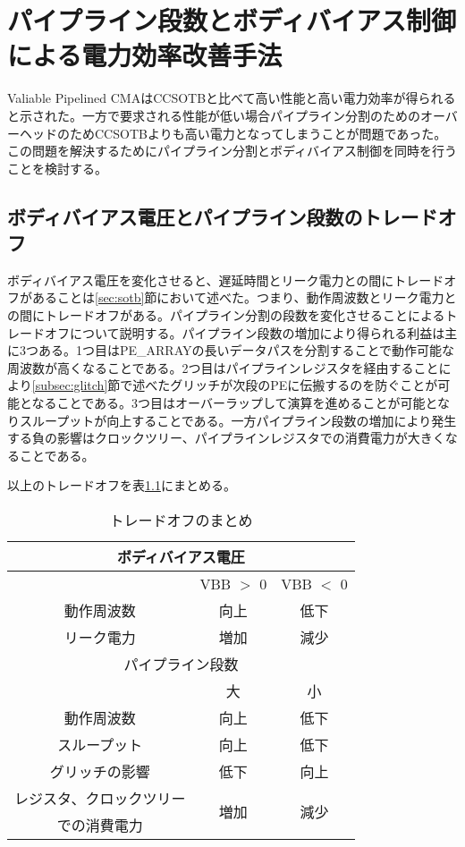 \chapter{パイプライン段数とボディバイアス制御による電力効率改善手法}
{
\label{chap:proposal}
Valiable Pipelined CMAはCCSOTBと比べて高い性能と高い電力効率が得られると示された。\cite{vpcma}一方で要求される性能が低い場合パイプライン分割のためのオーバーヘッドのためCCSOTBよりも高い電力となってしまうことが問題であった。この問題を解決するためにパイプライン分割とボディバイアス制御を同時を行うことを検討する。
\section{ボディバイアス電圧とパイプライン段数のトレードオフ}
\label{sec:trade_off}

ボディバイアス電圧を変化させると、遅延時間とリーク電力との間にトレードオフがあることは\ref{sec:sotb}節において述べた。つまり、動作周波数とリーク電力との間にトレードオフがある。パイプライン分割の段数を変化させることによるトレードオフについて説明する。パイプライン段数の増加により得られる利益は主に3つある。1つ目はPE\_ARRAYの長いデータパスを分割することで動作可能な周波数が高くなることである。2つ目はパイプラインレジスタを経由することにより\ref{subsec:glitch}節で述べたグリッチが次段のPEに伝搬するのを防ぐことが可能となることである。3つ目はオーバーラップして演算を進めることが可能となりスループットが向上することである。一方パイプライン段数の増加により発生する負の影響はクロックツリー、パイプラインレジスタでの消費電力が大きくなることである。

以上のトレードオフを表\ref{table:trade_off}にまとめる。

\begin{table}[h]
\centering
\caption{トレードオフのまとめ}
\label{table:trade_off}
\begin{tabular}{|c|c|c|} \hline
\multicolumn{3}{|c|}{ボディバイアス電圧} \\ \hline
 & VBB $>$ 0 & VBB $<$ 0 \\ \hline \hline
動作周波数 & 向上 & 低下 \\ \hline
リーク電力 & 増加 & 減少 \\ \hline \hline
\multicolumn{3}{|c|}{パイプライン段数} \\ \hline
& 大 & 小 \\ \hline \hline
動作周波数 & 向上 & 低下 \\ \hline
スループット & 向上 & 低下 \\ \hline
グリッチの影響 & 低下 & 向上 \\ \hline
レジスタ、クロックツリー & \multirow{2}{*}{増加} & \multirow{2}{*}{減少}\\ 
での消費電力　& & \\ \hline
\end{tabular}
\end{table}

}
